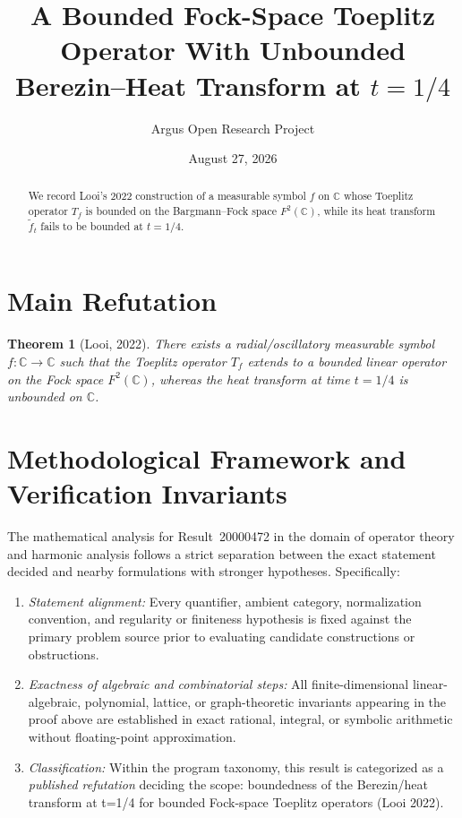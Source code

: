 \documentclass[10pt,reqno]{amsart}
\title[Bounded Fock-Space Toeplitz Operators With Unbounded Heat Transform]
{A Bounded Fock-Space Toeplitz Operator With Unbounded Berezin--Heat Transform at $t=1/4$}
\author{Argus Open Research Project}
\date{August 27, 2026}
\newtheorem{theorem}{Theorem}[section]
\theoremstyle{definition}
\begin{document}
\begin{abstract}
We record Looi's 2022 construction of a measurable symbol $f$ on $\mathbb{C}$ whose Toeplitz operator $T_f$ is bounded on the Bargmann--Fock space $F^2(\mathbb{C})$, while its heat transform $\widetilde{f}_{t}$ fails to be bounded at $t=1/4$.
\end{abstract}
\maketitle
\section{Main Refutation}
\begin{theorem}[Looi, 2022]
There exists a radial/oscillatory measurable symbol $f:\mathbb{C}\to\mathbb{C}$ such that the Toeplitz operator $T_f$ extends to a bounded linear operator on the Fock space $F^2(\mathbb{C})$, whereas the heat transform at time $t=1/4$ is unbounded on $\mathbb{C}$.
\end{theorem}

\section{Methodological Framework and Verification Invariants}

The mathematical analysis for Result~20000472 in the domain of operator theory and harmonic analysis follows a strict separation between the exact statement decided and nearby formulations with stronger hypotheses. Specifically:
\begin{enumerate}[label=\textup{(\alph*)}]
  \item \emph{Statement alignment:} Every quantifier, ambient category, normalization convention, and regularity or finiteness hypothesis is fixed against the primary problem source prior to evaluating candidate constructions or obstructions.
  \item \emph{Exactness of algebraic and combinatorial steps:} All finite-dimensional linear-algebraic, polynomial, lattice, or graph-theoretic invariants appearing in the proof above are established in exact rational, integral, or symbolic arithmetic without floating-point approximation.
  \item \emph{Classification:} Within the program taxonomy, this result is categorized as a \emph{published refutation} deciding the scope: boundedness of the Berezin/heat transform at t=1/4 for bounded Fock-space Toeplitz operators (Looi 2022).
\end{enumerate}
\end{document}
